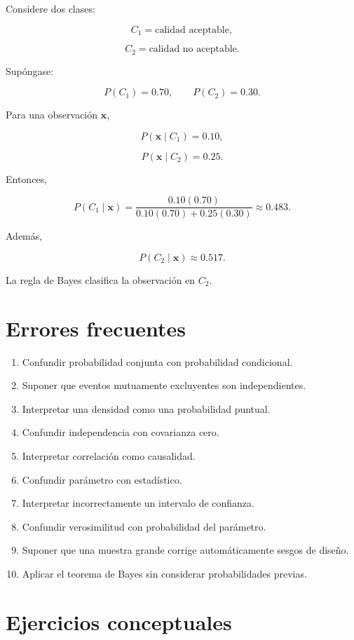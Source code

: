 \documentclass[
  spanish,
  11pt,
  letterpaper,
  DIV=11,
  numbers=noendperiod]{scrreprt}
\providecommand{\tightlist}{%
  \setlength{\itemsep}{0pt}\setlength{\parskip}{0pt}}
\theoremstyle{definition}
\theoremstyle{plain}
\theoremstyle{definition}
\theoremstyle{remark}
\begin{document}
Considere dos clases:

\[
C_1=\text{calidad aceptable},
\]

\[
C_2=\text{calidad no aceptable}.
\]

Supóngase:

\[
P(C_1)=0.70,
\qquad
P(C_2)=0.30.
\]

Para una observación \(\mathbf{x}\),

\[
P(\mathbf{x}\mid C_1)=0.10,
\]

\[
P(\mathbf{x}\mid C_2)=0.25.
\]

Entonces,

\[
P(C_1\mid\mathbf{x})
=
\frac{
0.10(0.70)
}{
0.10(0.70)+0.25(0.30)
}
\approx 0.483.
\]

Además,

\[
P(C_2\mid\mathbf{x})
\approx 0.517.
\]

La regla de Bayes clasifica la observación en \(C_2\).

\section{Errores frecuentes}\label{errores-frecuentes-2}

\begin{enumerate}
\def\labelenumi{\arabic{enumi}.}
\tightlist
\item
  Confundir probabilidad conjunta con probabilidad condicional.
\item
  Suponer que eventos mutuamente excluyentes son independientes.
\item
  Interpretar una densidad como una probabilidad puntual.
\item
  Confundir independencia con covarianza cero.
\item
  Interpretar correlación como causalidad.
\item
  Confundir parámetro con estadístico.
\item
  Interpretar incorrectamente un intervalo de confianza.
\item
  Confundir verosimilitud con probabilidad del parámetro.
\item
  Suponer que una muestra grande corrige automáticamente sesgos de
  diseño.
\item
  Aplicar el teorema de Bayes sin considerar probabilidades previas.
\end{enumerate}

\section{Ejercicios conceptuales}\label{ejercicios-conceptuales-2}
\end{document}
